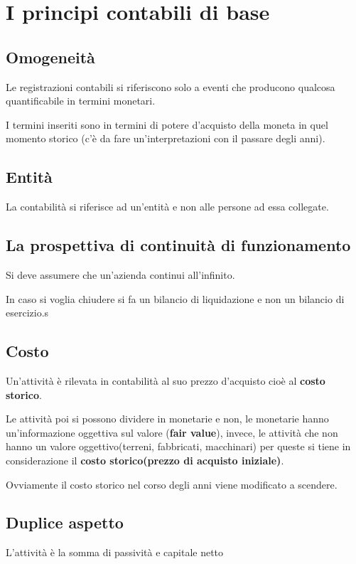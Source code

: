\section{I principi contabili di base}
\subsection{Omogeneità}
Le registrazioni contabili si riferiscono solo a eventi che producono qualcosa quantificabile in termini monetari.

I termini inseriti sono in termini di potere d'acquisto della moneta in quel momento storico
(c'è da fare un'interpretazioni con il passare degli anni).


\subsection{Entità}

La contabilità si riferisce ad un'entità e non alle persone ad essa collegate.


\subsection{La prospettiva di continuità di funzionamento}
Si deve assumere che un'azienda continui all'infinito.

In caso si voglia chiudere si fa un bilancio di liquidazione e non un bilancio di esercizio.s


\subsection{Costo}
Un'attività è rilevata in contabilità al suo prezzo d'acquisto cioè al \textbf{costo storico}.

Le attività poi si possono dividere in monetarie e non, le monetarie hanno un'informazione
oggettiva sul valore (\textbf{fair value}), invece, le attività che non hanno un valore oggettivo(terreni, fabbricati, macchinari) per queste si tiene in considerazione il \textbf{costo storico(prezzo di acquisto iniziale)}.

Ovviamente il costo storico nel corso degli anni viene modificato a scendere.



\subsection{Duplice aspetto}

L'attività è la somma di passività e capitale netto
